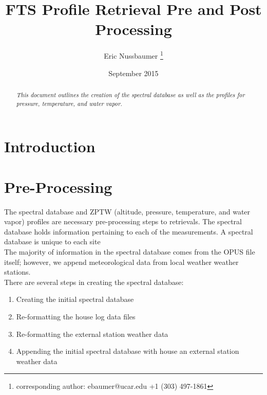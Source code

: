 \documentclass[12pt, letterpaper]{article}
\title{FTS Profile Retrieval Pre and Post Processing}
\author[1]{Eric Nussbaumer \thanks{corresponding author: ebaumer@ucar.edu +1 (303) 497-1861}}
\affil[1]{National Center for Atmospheric Research, Boulder, CO, USA}
\date{September 2015}
\begin{document}
\begin{titlepage}

\maketitle
\thispagestyle{empty}
\pagestyle{empty}

\begin{abstract}
  \begin{adjustwidth}{2em}{2em} 
    \large{
      \emph{
This document outlines the creation of the spectral database as well as the profiles for pressure, temperature, and water vapor.
}}
      
  \end{adjustwidth}

\end{abstract}

\end{titlepage}
 
\newpage
\tableofcontents
\newpage


\section{Introduction} 
\label{sec:intro}



\section{Pre-Processing}
The spectral database and ZPTW (altitude, pressure, temperature, and water vapor) profiles are necessary pre-processing steps to retrievals. The spectral database holds information pertaining to each of the measurements. A spectral database is unique to each site\\

\noindent The majority of information in the spectral database comes from the OPUS file itself; however, we append meteorological data from local weather weather stations.\\

\noindent There are several steps in creating the spectral database:\\

\begin{enumerate}
\item Creating the initial spectral database
\item Re-formatting the house log data files
\item Re-formatting the external station weather data
\item Appending the initial spectral database with house an external station weather data
\end{enumerate}
\end{document}
